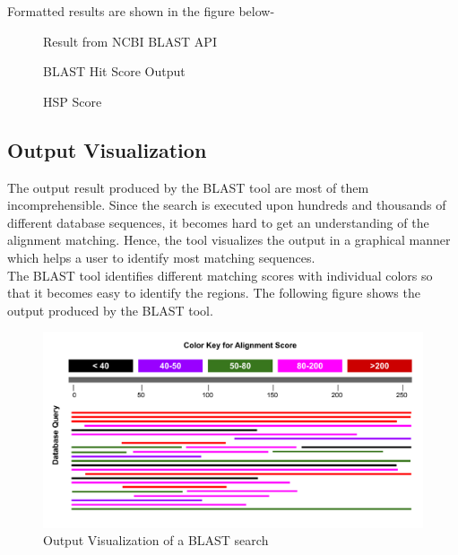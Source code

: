 \documentclass[12pt, a4paper]{report}
\begin{document}
Formatted results are shown in the figure below- \\


\begin{figure}[H]
    \centering
    \caption{Result from NCBI BLAST API}
\end{figure}

\begin{figure}[H]
    \centering
    \caption{BLAST Hit Score Output}
\end{figure}

\begin{figure}[H]
    \centering
    \caption{HSP Score}
\end{figure}

\subsection{Output Visualization}

The output result produced by the BLAST tool are most of them incomprehensible. Since the search is executed upon hundreds and thousands of different database sequences, it becomes hard to get an understanding of the alignment matching. Hence, the tool visualizes the output in a graphical manner which helps a user to identify most matching sequences. \\

The BLAST tool identifies different matching scores with individual colors so that it becomes easy to identify the regions. The following figure shows the output produced by the BLAST tool.

\begin{figure}[H]
    \centering
    \includegraphics[width=\textwidth]{files/visual_output.pdf}
    \caption{Output Visualization of a BLAST search}
\end{figure}
\end{document}
